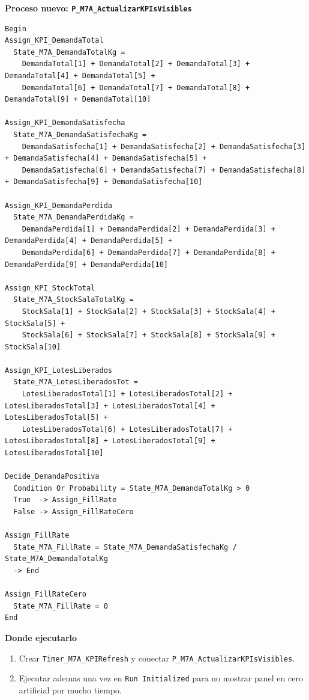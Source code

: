 \documentclass[11pt]{article}
\newcommand{\simio}[1]{\texttt{#1}}
\newcommand{\proc}[1]{\texttt{#1}}
\begin{document}
\textbf{Proceso nuevo: \proc{P\_M7A\_ActualizarKPIsVisibles}}
\begin{lstlisting}[caption={Bloques cerrados de P M7A ActualizarKPIsVisibles}]
Begin
Assign_KPI_DemandaTotal
  State_M7A_DemandaTotalKg =
    DemandaTotal[1] + DemandaTotal[2] + DemandaTotal[3] + DemandaTotal[4] + DemandaTotal[5] +
    DemandaTotal[6] + DemandaTotal[7] + DemandaTotal[8] + DemandaTotal[9] + DemandaTotal[10]

Assign_KPI_DemandaSatisfecha
  State_M7A_DemandaSatisfechaKg =
    DemandaSatisfecha[1] + DemandaSatisfecha[2] + DemandaSatisfecha[3] + DemandaSatisfecha[4] + DemandaSatisfecha[5] +
    DemandaSatisfecha[6] + DemandaSatisfecha[7] + DemandaSatisfecha[8] + DemandaSatisfecha[9] + DemandaSatisfecha[10]

Assign_KPI_DemandaPerdida
  State_M7A_DemandaPerdidaKg =
    DemandaPerdida[1] + DemandaPerdida[2] + DemandaPerdida[3] + DemandaPerdida[4] + DemandaPerdida[5] +
    DemandaPerdida[6] + DemandaPerdida[7] + DemandaPerdida[8] + DemandaPerdida[9] + DemandaPerdida[10]

Assign_KPI_StockTotal
  State_M7A_StockSalaTotalKg =
    StockSala[1] + StockSala[2] + StockSala[3] + StockSala[4] + StockSala[5] +
    StockSala[6] + StockSala[7] + StockSala[8] + StockSala[9] + StockSala[10]

Assign_KPI_LotesLiberados
  State_M7A_LotesLiberadosTot =
    LotesLiberadosTotal[1] + LotesLiberadosTotal[2] + LotesLiberadosTotal[3] + LotesLiberadosTotal[4] + LotesLiberadosTotal[5] +
    LotesLiberadosTotal[6] + LotesLiberadosTotal[7] + LotesLiberadosTotal[8] + LotesLiberadosTotal[9] + LotesLiberadosTotal[10]

Decide_DemandaPositiva
  Condition Or Probability = State_M7A_DemandaTotalKg > 0
  True  -> Assign_FillRate
  False -> Assign_FillRateCero

Assign_FillRate
  State_M7A_FillRate = State_M7A_DemandaSatisfechaKg / State_M7A_DemandaTotalKg
  -> End

Assign_FillRateCero
  State_M7A_FillRate = 0
End
\end{lstlisting}

\textbf{Donde ejecutarlo}
\begin{enumerate}
  \item Crear \simio{Timer\_M7A\_KPIRefresh} y conectar \proc{P\_M7A\_ActualizarKPIsVisibles}.
  \item Ejecutar ademas una vez en \simio{Run Initialized} para no mostrar panel en cero artificial por mucho tiempo.
\end{enumerate}
\end{document}
